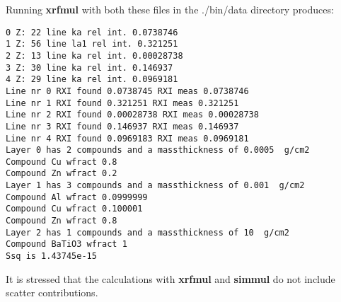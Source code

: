 Running {\bf xrfmul} with both these files in the ./bin/data  directory
produces:
\begin{verbatim}
0 Z: 22 line ka rel int. 0.0738746 
1 Z: 56 line la1 rel int. 0.321251 
2 Z: 13 line ka rel int. 0.00028738 
3 Z: 30 line ka rel int. 0.146937 
4 Z: 29 line ka rel int. 0.0969181 
Line nr 0 RXI found 0.0738745 RXI meas 0.0738746
Line nr 1 RXI found 0.321251 RXI meas 0.321251
Line nr 2 RXI found 0.00028738 RXI meas 0.00028738
Line nr 3 RXI found 0.146937 RXI meas 0.146937
Line nr 4 RXI found 0.0969183 RXI meas 0.0969181
Layer 0 has 2 compounds and a massthickness of 0.0005  g/cm2
Compound Cu wfract 0.8  
Compound Zn wfract 0.2  
Layer 1 has 3 compounds and a massthickness of 0.001  g/cm2
Compound Al wfract 0.0999999  
Compound Cu wfract 0.100001  
Compound Zn wfract 0.8  
Layer 2 has 1 compounds and a massthickness of 10  g/cm2
Compound BaTiO3 wfract 1  
Ssq is 1.43745e-15
\end{verbatim}
It is stressed that the calculations with {\bf xrfmul} and {\bf simmul}
do not include scatter contributions. 



